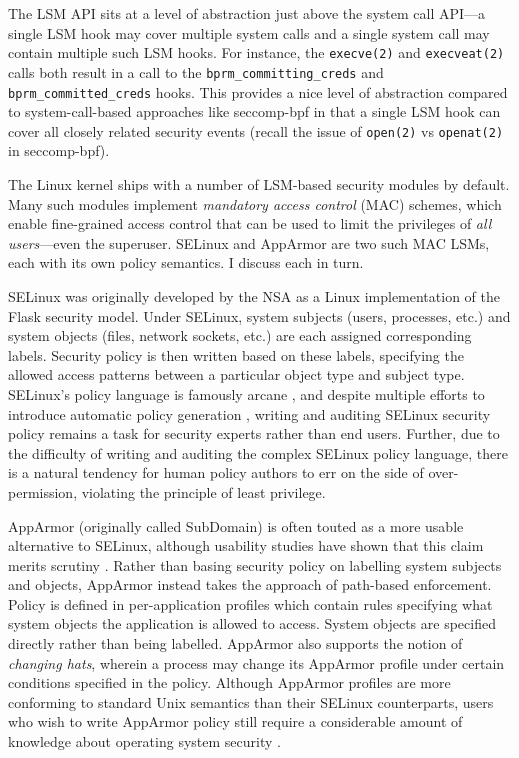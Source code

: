\documentclass[dvipsnames, 12pt]{article}
\begin{document}
The LSM API sits at a level of abstraction just above the system call API---a
single LSM hook may cover multiple system calls and a single system call may
contain multiple such LSM hooks. For instance, the \texttt{execve(2)} and
\texttt{execveat(2)} calls both result in a call to the
\texttt{bprm\_committing\_creds} and  \texttt{bprm\_committed\_creds} hooks.
This provides a nice level of abstraction compared to system-call-based
approaches like seccomp-bpf \cite{seccomp_bpf, drewry2012_seccomp_bpf} in that
a single LSM hook can cover all closely related security events (recall the
issue of \texttt{open(2)} vs \texttt{openat(2)} in seccomp-bpf).

The Linux kernel ships with a number of LSM-based security modules by default.
Many such modules implement \textit{mandatory access control} (MAC) schemes,
which enable fine-grained access control that can be used to limit the
privileges of \textit{all users}---even the superuser. SELinux
\cite{smalley2001_selinux} and AppArmor \cite{cowan2000_apparmor} are two such
MAC LSMs, each with its own policy semantics. I discuss each in turn.

SELinux \cite{smalley2001_selinux} was originally developed by the NSA as
a Linux implementation of the Flask \cite{spencer1999_flask} security model.
Under SELinux, system subjects (users, processes, etc.) and system objects
(files, network sockets, etc.) are each assigned corresponding labels. Security
policy is then written based on these labels, specifying the allowed access
patterns between a particular object type and subject type. SELinux's policy
language is famously arcane \cite{schreuders12_towards}, and despite multiple
efforts to introduce automatic policy generation \cite{audit2allow,
macmillan07_madison, macmillan07_madison}, writing and auditing SELinux security
policy remains a task for security experts rather than end users. Further, due
to the difficulty of writing and auditing the complex SELinux policy language,
there is a natural tendency for human policy authors to err on the side of
over-permission, violating the principle of least privilege.

AppArmor (originally called SubDomain) \cite{cowan2000_apparmor} is often touted
as a more usable alternative to SELinux, although usability studies have shown
that this claim merits scrutiny \cite{schreuders12_towards}. Rather than basing
security policy on labelling system subjects and objects, AppArmor instead takes
the approach of path-based enforcement. Policy is defined in per-application
profiles which contain rules specifying what system objects the application is
allowed to access. System objects are specified directly rather than being
labelled.  AppArmor also supports the notion of \textit{changing hats}, wherein
a process may change its AppArmor profile under certain conditions specified in
the policy.  Although AppArmor profiles are more conforming to standard Unix
semantics than their SELinux counterparts, users who wish to write AppArmor
policy still require a considerable amount of knowledge about operating system
security \cite{schreuders12_towards}.
\end{document}
